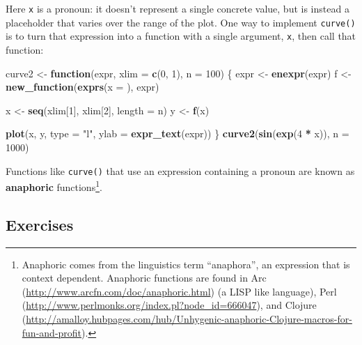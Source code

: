 \documentclass[]{book}
\newenvironment{Shaded}{\begin{snugshade}}{\end{snugshade}}
\newcommand{\ControlFlowTok}[1]{\textcolor[rgb]{0.27,0.27,0.27}{\textbf{#1}}}
\newcommand{\DataTypeTok}[1]{\textcolor[rgb]{0.27,0.27,0.27}{#1}}
\newcommand{\DecValTok}[1]{\textcolor[rgb]{0.06,0.06,0.06}{#1}}
\newcommand{\KeywordTok}[1]{\textcolor[rgb]{0.27,0.27,0.27}{\textbf{#1}}}
\newcommand{\NormalTok}[1]{#1}
\newcommand{\OperatorTok}[1]{\textcolor[rgb]{0.43,0.43,0.43}{\textbf{#1}}}
\newcommand{\StringTok}[1]{\textcolor[rgb]{0.5,0.5,0.5}{#1}}
\let\rmarkdownfootnote\footnote%
\def\footnote{\protect\rmarkdownfootnote}
\renewcommand{\href}[2]{#2 (\url{#1})}
\begin{document}
Here \texttt{x} is a pronoun: it doesn't represent a single concrete value, but is instead a placeholder that varies over the range of the plot. One way to implement \texttt{curve()} is to turn that expression into a function with a single argument, \texttt{x}, then call that function:

\begin{Shaded}
\begin{Highlighting}[]
\NormalTok{curve2 <-}\StringTok{ }\ControlFlowTok{function}\NormalTok{(expr, }\DataTypeTok{xlim =} \KeywordTok{c}\NormalTok{(}\DecValTok{0}\NormalTok{, }\DecValTok{1}\NormalTok{), }\DataTypeTok{n =} \DecValTok{100}\NormalTok{) \{}
\NormalTok{  expr <-}\StringTok{ }\KeywordTok{enexpr}\NormalTok{(expr)}
\NormalTok{  f <-}\StringTok{ }\KeywordTok{new_function}\NormalTok{(}\KeywordTok{exprs}\NormalTok{(}\DataTypeTok{x =}\NormalTok{ ), expr)}
  
\NormalTok{  x <-}\StringTok{ }\KeywordTok{seq}\NormalTok{(xlim[}\DecValTok{1}\NormalTok{], xlim[}\DecValTok{2}\NormalTok{], }\DataTypeTok{length =}\NormalTok{ n)}
\NormalTok{  y <-}\StringTok{ }\KeywordTok{f}\NormalTok{(x)}

  \KeywordTok{plot}\NormalTok{(x, y, }\DataTypeTok{type =} \StringTok{"l"}\NormalTok{, }\DataTypeTok{ylab =} \KeywordTok{expr_text}\NormalTok{(expr))}
\NormalTok{\}}
\KeywordTok{curve2}\NormalTok{(}\KeywordTok{sin}\NormalTok{(}\KeywordTok{exp}\NormalTok{(}\DecValTok{4} \OperatorTok{*}\StringTok{ }\NormalTok{x)), }\DataTypeTok{n =} \DecValTok{1000}\NormalTok{)}
\end{Highlighting}
\end{Shaded}

Functions like \texttt{curve()} that use an expression containing a pronoun are known as \textbf{anaphoric} functions\footnote{Anaphoric comes from the linguistics term ``anaphora'', an expression that is context dependent. Anaphoric functions are found in \href{http://www.arcfn.com/doc/anaphoric.html}{Arc} (a LISP like language), \href{http://www.perlmonks.org/index.pl?node_id=666047}{Perl}, and \href{http://amalloy.hubpages.com/hub/Unhygenic-anaphoric-Clojure-macros-for-fun-and-profit}{Clojure}.}.

\hypertarget{exercises-8}{%
\subsection{Exercises}\label{exercises-8}}
\end{document}
